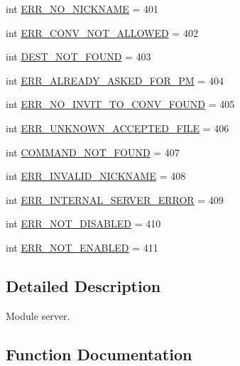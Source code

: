 \begin{DoxyCompactItemize}
\item 
int \hyperlink{namespace_server_ac38a41cef46c16cd55f914479173d7e7}{E\+R\+R\+\_\+\+N\+O\+\_\+\+N\+I\+C\+K\+N\+A\+M\+E} = 401
\item 
int \hyperlink{namespace_server_a4a2b6adb4d445ae828f03ab00e99024b}{E\+R\+R\+\_\+\+C\+O\+N\+V\+\_\+\+N\+O\+T\+\_\+\+A\+L\+L\+O\+W\+E\+D} = 402
\item 
int \hyperlink{namespace_server_a58ccc0de13c1317e02ae6c7acc95babd}{D\+E\+S\+T\+\_\+\+N\+O\+T\+\_\+\+F\+O\+U\+N\+D} = 403
\item 
int \hyperlink{namespace_server_a3636d43b6ad3b3f41bf531830f567577}{E\+R\+R\+\_\+\+A\+L\+R\+E\+A\+D\+Y\+\_\+\+A\+S\+K\+E\+D\+\_\+\+F\+O\+R\+\_\+\+P\+M} = 404
\item 
int \hyperlink{namespace_server_a64e45a54c72b15ec3ef27064a69067bf}{E\+R\+R\+\_\+\+N\+O\+\_\+\+I\+N\+V\+I\+T\+\_\+\+T\+O\+\_\+\+C\+O\+N\+V\+\_\+\+F\+O\+U\+N\+D} = 405
\item 
int \hyperlink{namespace_server_ad7305f8755fe9025d1a08d7e28931fff}{E\+R\+R\+\_\+\+U\+N\+K\+N\+O\+W\+N\+\_\+\+A\+C\+C\+E\+P\+T\+E\+D\+\_\+\+F\+I\+L\+E} = 406
\item 
int \hyperlink{namespace_server_accfadc084947316e3de1bf2e8f0292de}{C\+O\+M\+M\+A\+N\+D\+\_\+\+N\+O\+T\+\_\+\+F\+O\+U\+N\+D} = 407
\item 
int \hyperlink{namespace_server_a8a68f5e3a20d872bc0a0657c42e2281d}{E\+R\+R\+\_\+\+I\+N\+V\+A\+L\+I\+D\+\_\+\+N\+I\+C\+K\+N\+A\+M\+E} = 408
\item 
int \hyperlink{namespace_server_a3515074e422119d92e2f6a0087eda6a9}{E\+R\+R\+\_\+\+I\+N\+T\+E\+R\+N\+A\+L\+\_\+\+S\+E\+R\+V\+E\+R\+\_\+\+E\+R\+R\+O\+R} = 409
\item 
int \hyperlink{namespace_server_a03d76767907390977f2f88588ddb2e46}{E\+R\+R\+\_\+\+N\+O\+T\+\_\+\+D\+I\+S\+A\+B\+L\+E\+D} = 410
\item 
int \hyperlink{namespace_server_acc557207eefe9a375185ff17a8f4c641}{E\+R\+R\+\_\+\+N\+O\+T\+\_\+\+E\+N\+A\+B\+L\+E\+D} = 411
\end{DoxyCompactItemize}


\subsection{Detailed Description}
Module server. 

\subsection{Function Documentation}
\hypertarget{namespace_server_a0f21810c2b82ea1a98725185d2f3a70a}{}
